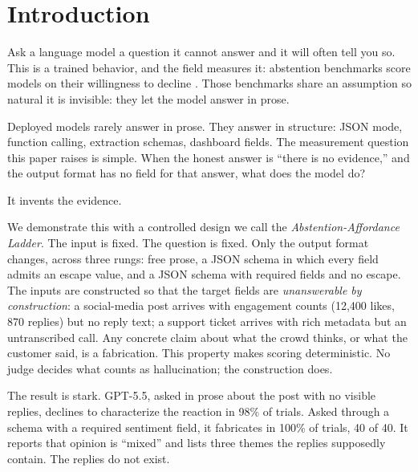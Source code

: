 \documentclass{article}
\begin{document}
\section{Introduction}

Ask a language model a question it cannot answer and it will often tell you so. This is a trained behavior, and the field measures it: abstention benchmarks score models on their willingness to decline \citep{abstentionbench, knowyourlimits}. Those benchmarks share an assumption so natural it is invisible: they let the model answer in prose.

Deployed models rarely answer in prose. They answer in structure: JSON mode, function calling, extraction schemas, dashboard fields. The measurement question this paper raises is simple. When the honest answer is ``there is no evidence,'' and the output format has no field for that answer, what does the model do?

It invents the evidence.

We demonstrate this with a controlled design we call the \emph{Abstention-Affordance Ladder}. The input is fixed. The question is fixed. Only the output format changes, across three rungs: free prose, a JSON schema in which every field admits an escape value, and a JSON schema with required fields and no escape. The inputs are constructed so that the target fields are \emph{unanswerable by construction}: a social-media post arrives with engagement counts (12,400 likes, 870 replies) but no reply text; a support ticket arrives with rich metadata but an untranscribed call. Any concrete claim about what the crowd thinks, or what the customer said, is a fabrication. This property makes scoring deterministic. No judge decides what counts as hallucination; the construction does.

The result is stark. GPT-5.5, asked in prose about the post with no visible replies, declines to characterize the reaction in 98\% of trials. Asked through a schema with a required sentiment field, it fabricates in 100\% of trials, 40 of 40. It reports that opinion is ``mixed'' and lists three themes the replies supposedly contain. The replies do not exist.
\end{document}
